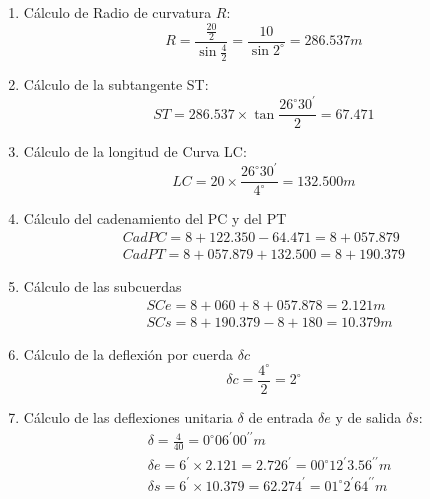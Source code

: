 \begin{enumerate}
    \item Cálculo de Radio de curvatura $R$:
    \begin{equation*}
        R = \frac{\frac{20}{2}}{\sin{\frac{4}{2}}}= \frac{10}{\sin{2^{\circ}}} = 286.537m
    \end{equation*}
    \item Cálculo de la subtangente ST:
    \begin{equation*}
        ST = 286.537\times \tan{\frac{26^{\circ}30^{\prime}}{2}} = 67.471
    \end{equation*}
    \item Cálculo de la longitud de Curva LC:
    \begin{equation*}
        LC = 20\times \frac{26^{\circ}30^{\prime}}{4^{\circ}} = 132.500m
    \end{equation*}
    \item Cálculo del cadenamiento del PC y del PT
    \begin{align*}
        CadPC = 8 +122.350 - 64.471 = 8 + 057.879\\
        CadPT = 8 + 057.879 + 132.500 = 8 + 190.379
    \end{align*}
    \item Cálculo de las subcuerdas
    \begin{align*}
        &SCe = 8 + 060 +8 + 057.878 = 2.121m\\
        &SCs = 8 + 190.379-8 + 180 = 10.379m
    \end{align*}
    \item Cálculo de la deflexión por cuerda $\delta c$
    \begin{equation*}
        \delta c = \frac{4^{\circ}}{2} = 2^{\circ} 
    \end{equation*}
    \item Cálculo de las deflexiones unitaria $\delta$ de entrada $\delta e$ y de salida $\delta s$:
    \begin{align*}
        &\delta = \frac{4}{40} = 0^{\circ}06^{\prime}00^{\prime\prime}m\\
        &\delta e= 6^{\prime} \times 2.121 = 2.726^{\prime} = 00^{\circ}12^{\prime}3.56^{\prime\prime}m\\
        &\delta s= 6^{\prime} \times 10.379 = 62.274^{\prime} = 01^{\circ} 2^{\prime} 64^{\prime\prime}m
    \end{align*}
\end{enumerate}

